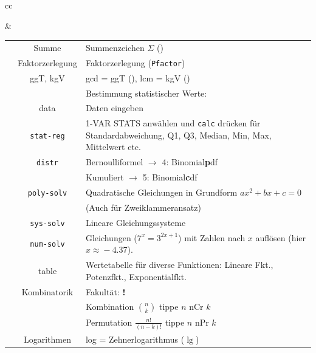 \begin{tabular}{cc}


&

\begin{tabular}{c|c|p{80mm}}\hline
\tiprobutton{math}         &Summe             & Summenzeichen $\Sigma$ (\tiprobutton{5})\\
                           &Faktorzerlegung   & Faktorzerlegung (\tiprobutton{4}\texttt{Pfactor})\\
                           & ggT, kgV         & gcd = ggT
(\tiprobutton{3}), lcm = kgV (\tiprobutton{2})\\\hline
                           &                  & Bestimmung statistischer Werte:\\
\tiprobutton{data}         & data             & Daten eingeben\\
                           &\texttt{stat-reg} & 1-VAR STATS anwählen
und \texttt{calc} drücken für Standardabweichung, Q1, Q3, Median, Min,
Max, Mittelwert etc.\\
                           &\texttt{distr}    & Bernoulliformel $\rightarrow$ 4: Binomial\textbf{p}df\\
                           &                  & Kumuliert $\rightarrow$ 5: Binomial\textbf{c}df\\\hline
\tiprobutton{cos_poly-solv}&\texttt{poly-solv}&  Quadratische Gleichungen in Grundform $ax^2+bx+c=0$\\
                           &                  &  (Auch für Zweiklammeransatz)\\\hline
\tiprobutton{tan_sys-solv} &\texttt{sys-solv} &  Lineare Gleichungssysteme\\\hline
\tiprobutton{sin_num-solv} &\texttt{num-solv} &  Gleichungen ($7^x=3^{2x+1}$) mit Zahlen nach $x$ auf\/lösen (hier $x\approx{}-4.37$).\\\hline
\tiprobutton{table}        & table            &  Wertetabelle für diverse Funktionen: Lineare Fkt., Potenzfkt., Exponentialfkt.\\\hline
\tiprobutton{ncrnpr}       &Kombinatorik      &  Fakultät: {\color{red}\textbf{!}}\\
                           &                  &  Kombination $n \choose k$ tippe $n$ nCr $k$\\
                           &                  &  Permutation $\frac{n!}{(n-k)!}$ tippe $n$ nPr $k$\\\hline
\tiprobutton{ln_log}       &  Logarithmen     &  log = Zehnerlogarithmus ($\lg$)\\

\end{tabular}
\end{tabular}
